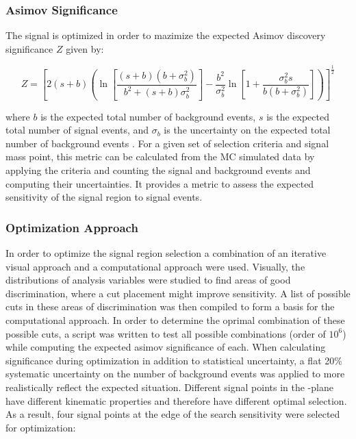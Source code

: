 \subsubsection{Asimov Significance}
The \merged signal is optimized in order to mazimize the expected Asimov discovery significance $Z$ given by:

\begin{equation}
  Z = \left[ 2(s+b)\left(
    \ln\left[ \frac{(s+b)(b+\sigma_b^2)}{b^2 + (s+b)\sigma_b^2} \right]
    - \frac{b^2}{\sigma_b^2}\ln\left[ 1 + \frac{\sigma_b^2 s}{b(b+\sigma_b^2)} \right]
  \right) \right]^\frac{1}{2}
  \label{eq:asimov}
\end{equation}

where $b$ is the expected total number of background events, $s$ is the expected total number of signal events, and $\sigma_b$ is the uncertainty on the expected total number of background events \cite{Asimov}. For a given set of selection criteria and signal mass point, this metric can be calculated from the MC simulated data by applying the criteria and counting the signal and background events and computing their uncertainties. It provides a metric to assess the expected sensitivity of the signal region to signal events.

\subsubsection{Optimization Approach}
In order to optimize the signal region selection a combination of an iterative visual approach and a computational approach were used. Visually, the distributions of analysis variables were studied to find areas of good discrimination, where a cut placement might improve sensitivity. A list of possible cuts in these areas of discrimination was then compiled to form a basis for the computational approach. In order to determine the oprimal combination of these possible cuts, a script was written to test all possible combinations (order of $10^6$) while computing the expected asimov significance of each. When calculating significance during optimization in addition to statistical uncertainty, a flat 20\% systematic uncertainty on the number of background events was applied to more realistically reflect the expected situation. Different signal points in the \ms-\mZp plane have different kinematic properties and therefore have different optimal selection. As a result, four signal points at the edge of the search sensitivity were selected for optimization:

